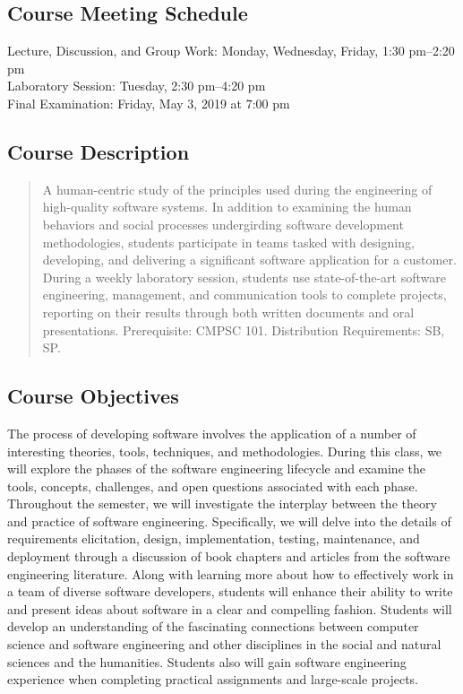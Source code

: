 \documentclass[11pt]{article}
\begin{document}
\subsection*{Course Meeting Schedule}

Lecture, Discussion, and Group Work: Monday, Wednesday, Friday, 1:30 pm--2:20 pm \\
Laboratory Session: Tuesday, 2:30 pm--4:20 pm \\
Final Examination: Friday, May 3, 2019 at 7:00 pm

\subsection*{Course Description}

\begin{quote}

A human-centric study of the principles used during the engineering of
high-quality software systems. In addition to examining the human behaviors and
social processes undergirding software development methodologies, students
participate in teams tasked with designing, developing, and delivering a
significant software application for a customer. During a weekly laboratory
session, students use state-of-the-art software engineering, management, and
communication tools to complete projects, reporting on their results through
both written documents and oral presentations. Prerequisite: CMPSC
101. Distribution Requirements: SB, SP.\@ \\

\end{quote}

\subsection*{Course Objectives}

The process of developing software involves the application of a number of
interesting theories, tools, techniques, and methodologies. During this class,
we will explore the phases of the software engineering lifecycle and examine
the tools, concepts, challenges, and open questions associated with each phase.
Throughout the semester, we will investigate the interplay between the theory
and practice of software engineering. Specifically, we will delve into the
details of requirements elicitation, design, implementation, testing,
maintenance, and deployment through a discussion of book chapters and articles
from the software engineering literature. Along with learning more about how to
effectively work in a team of diverse software developers, students will
enhance their ability to write and present ideas about software in a clear and
compelling fashion. Students will develop an understanding of the fascinating
connections between computer science and software engineering and other
disciplines in the social and natural sciences and the humanities. Students
also will gain software engineering experience when completing practical
assignments and large-scale projects.
\end{document}
